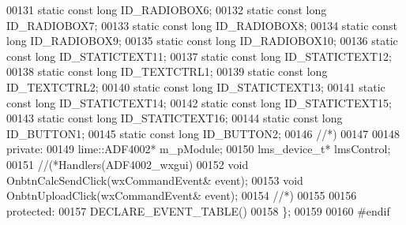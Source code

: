 \begin{DoxyCode}
00131     \textcolor{keyword}{static} \textcolor{keyword}{const} \textcolor{keywordtype}{long} ID_RADIOBOX6;
00132     \textcolor{keyword}{static} \textcolor{keyword}{const} \textcolor{keywordtype}{long} ID_RADIOBOX7;
00133     \textcolor{keyword}{static} \textcolor{keyword}{const} \textcolor{keywordtype}{long} ID_RADIOBOX8;
00134     \textcolor{keyword}{static} \textcolor{keyword}{const} \textcolor{keywordtype}{long} ID_RADIOBOX9;
00135     \textcolor{keyword}{static} \textcolor{keyword}{const} \textcolor{keywordtype}{long} ID_RADIOBOX10;
00136     \textcolor{keyword}{static} \textcolor{keyword}{const} \textcolor{keywordtype}{long} ID_STATICTEXT11;
00137     \textcolor{keyword}{static} \textcolor{keyword}{const} \textcolor{keywordtype}{long} ID_STATICTEXT12;
00138     \textcolor{keyword}{static} \textcolor{keyword}{const} \textcolor{keywordtype}{long} ID_TEXTCTRL1;
00139     \textcolor{keyword}{static} \textcolor{keyword}{const} \textcolor{keywordtype}{long} ID_TEXTCTRL2;
00140     \textcolor{keyword}{static} \textcolor{keyword}{const} \textcolor{keywordtype}{long} ID_STATICTEXT13;
00141     \textcolor{keyword}{static} \textcolor{keyword}{const} \textcolor{keywordtype}{long} ID_STATICTEXT14;
00142     \textcolor{keyword}{static} \textcolor{keyword}{const} \textcolor{keywordtype}{long} ID_STATICTEXT15;
00143     \textcolor{keyword}{static} \textcolor{keyword}{const} \textcolor{keywordtype}{long} ID_STATICTEXT16;
00144     \textcolor{keyword}{static} \textcolor{keyword}{const} \textcolor{keywordtype}{long} ID_BUTTON1;
00145     \textcolor{keyword}{static} \textcolor{keyword}{const} \textcolor{keywordtype}{long} ID_BUTTON2;
00146     \textcolor{comment}{//*)}
00147 
00148 \textcolor{keyword}{private}:
00149     lime::ADF4002* m_pModule;
00150     lms_device_t* lmsControl;
00151     \textcolor{comment}{//(*Handlers(ADF4002\_wxgui)}
00152     \textcolor{keywordtype}{void} OnbtnCalcSendClick(wxCommandEvent& event);
00153     \textcolor{keywordtype}{void} OnbtnUploadClick(wxCommandEvent& event);
00154     \textcolor{comment}{//*)}
00155 
00156 \textcolor{keyword}{protected}:
00157     DECLARE\_EVENT\_TABLE()
00158 \};
00159 
00160 \textcolor{preprocessor}{#endif}
\end{DoxyCode}
